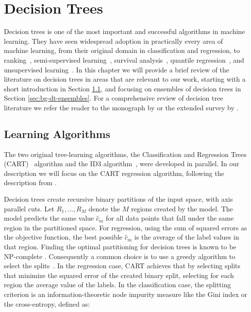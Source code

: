 \chapter{Decision Trees}
\label{ch:bg-decision-trees}

Decision trees is one of the most important and successful algorithms
in machine learning. They have seen widespread adoption in practically
every area of machine learning, from their original domain in classification
and regression, to ranking~\cite{lambdarank}, semi-supervised learning~\cite{semi-super-trees}, survival analysis~\cite{survival-forests},
quantile regression~\cite{meinshausen2006quantile}, and unsupervised learning~\cite{tree-clustering}. In this chapter
we will provide a brief review of the literature on decision trees in
areas that are relevant to our work, starting with a short introduction
in Section \ref{sec:bg-dt-learning-algorithms}, and focusing on ensembles of decision
trees in Section \ref{sec:bg-dt-ensembles}. For a comprehensive review of
decision tree literature we refer the reader to the monograph
by \citet{decision-trees-book} or the extended survey by \citet{tree-survey}.

\section{Learning Algorithms}
\label{sec:bg-dt-learning-algorithms}

The two original tree-learning algorithms, the
Classification and Regression Trees (CART)~\cite{breiman1984cart} algorithm and the ID3
algorithm~\cite{id3}, were developed in parallel. In our description we will
focus on the CART regression algorithm, following the description from \citet{esl}.

Decision trees create recursive binary partitions of the input space,
with axis parallel cuts. Let $R_1, ..., R_M$ denote the $M$ regions created by
the model.
The model predicts the same value $\hat{c}_m$ for all data points
that fall under the same region in the partitioned space. For regression,
using the sum of squared errors as the objective function, the best possible
$\hat{c}_m$ is the average of the label values in that region.
Finding the optimal partitioning for decision trees is known to be
NP-complete \cite{dt-np-complete}. Consequently a common choice
is to use a greedy algorithm to select the splits~\cite{dt-hardness}.
In the regression case, CART achieves that by selecting splits
that minimize the squared error of the created binary split, selecting
for each region the average value of the labels.
In the classification case, the splitting criterion is an information-theoretic
node impurity measure like the Gini index or the cross-entropy, defined as:

